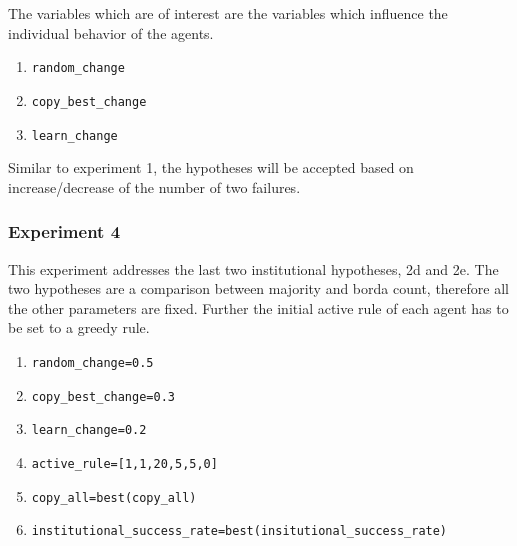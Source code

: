 \documentclass[a4paper]{article}
\begin{document}
The variables which are of interest are the variables which influence the individual behavior of the agents. 
\begin{enumerate}
 \item \begin{alltt}random_change \end{alltt}
 \item \begin{alltt}copy_best_change\end{alltt}
 \item \begin{alltt}learn_change\end{alltt}
\end{enumerate}
Similar to experiment 1, the hypotheses will be accepted based on increase/decrease of the number of two failures.

\subsubsection{Experiment 4}
This experiment addresses the last two institutional hypotheses, 2d and 2e. 
The two hypotheses are a comparison between majority and borda count, therefore all the other parameters 
are fixed. Further the initial active rule of each agent has to be set to a greedy rule. 

\begin{enumerate}
 \item  \begin{alltt}random_change  = 0.5 \end{alltt}
 \item  \begin{alltt}copy_best_change = 0.3\end{alltt}
 \item  \begin{alltt}learn_change = 0.2\end{alltt}
 \item  \begin{alltt}active_rule = [1,1,20,5,5,0]\end{alltt}
 \item  \begin{alltt}copy_all = best(copy_all)\end{alltt}
 \item  \begin{alltt}institutional_success_rate = best(insitutional_success_rate)\end{alltt}
\end{enumerate}
\end{document}
